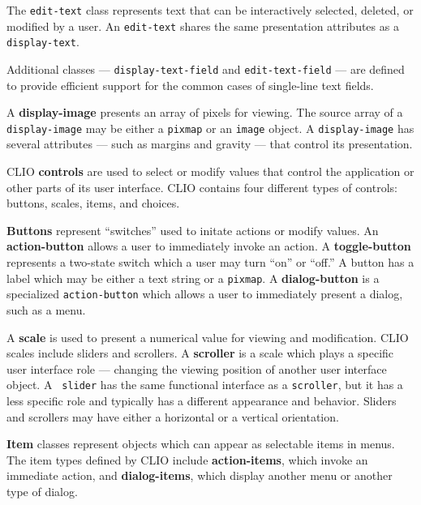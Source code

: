 The {\tt edit-text} class represents text that can be
interactively selected, deleted, or modified by a user. An {\tt edit-text}
shares the same presentation attributes as a {\tt display-text}.

Additional classes --- {\tt display-text-field} and
{\tt edit-text-field} --- are defined to provide
efficient support for the common cases of single-line text fields.


A {\bf display-image} presents an array of pixels for
viewing.  The source array of a {\tt display-image} may be either a {\tt pixmap}
or an {\tt image} object.  A {\tt display-image} has several attributes --- such
as margins and gravity --- that control its presentation.



CLIO {\bf controls} are used to select or modify values
that control the application or other parts of its user interface. CLIO contains
four different types of controls: buttons, scales, items, and choices.

{\bf Buttons} represent ``switches'' used to initate actions or
modify values.  An {\bf action-button} allows a user to
immediately invoke an action.  A {\bf toggle-button}
represents a two-state switch which a user may turn ``on'' or ``off.'' A button
has a label which may be either a text string or a {\tt pixmap}.  A {\bf
dialog-button} is a specialized {\tt action-button} which
allows a user to immediately present a dialog, such as a menu.

A {\bf scale} is used to present a numerical value for viewing and
modification.  CLIO scales include sliders and scrollers.  A {\bf
scroller} is a scale which plays a specific user interface role
--- changing the viewing position of another user interface object.  A {\tt
slider} has the same functional interface as a {\tt scroller}, but it has a less
specific role and typically has a different appearance and behavior.  Sliders
and scrollers may have either a horizontal or a vertical orientation.

{\bf Item} classes represent objects which can appear as
selectable items in menus.  The item types defined by CLIO include {\bf
action-items}, which invoke an immediate action, and {\bf
dialog-items}, which display another menu or another type
of dialog.

